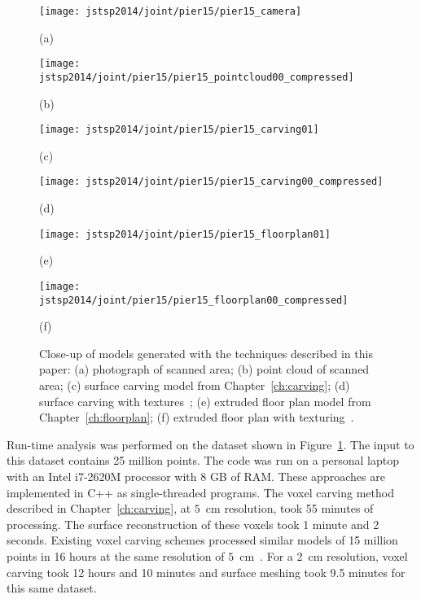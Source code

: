 \documentclass[12pt,onecolumn,oneside]{book}
\begin{document}
\begin{figure}[p]

	\centering
	\begin{minipage}[t]{0.49\linewidth}
		\centerline{\texttt{[image: jstsp2014/joint/pier15/pier15\_camera]}}
		\centerline{(a)}\medskip
	\end{minipage}
	\hfill
	\begin{minipage}[t]{0.49\linewidth}
		\centerline{\texttt{[image: jstsp2014/joint/pier15/pier15\_pointcloud00\_compressed]}}
		\centerline{(b)}\medskip
	\end{minipage}

	\begin{minipage}[t]{0.49\linewidth}
		\centerline{\texttt{[image: jstsp2014/joint/pier15/pier15\_carving01]}}
		\centerline{(c)}\medskip
	\end{minipage}
	\hfill
	\begin{minipage}[t]{0.49\linewidth}
		\centerline{\texttt{[image: jstsp2014/joint/pier15/pier15\_carving00\_compressed]}}
		\centerline{(d)}\medskip
	\end{minipage}
	
	\begin{minipage}[t]{0.49\linewidth}
		\centerline{\texttt{[image: jstsp2014/joint/pier15/pier15\_floorplan01]}}
		\centerline{(e)}\medskip
	\end{minipage}
	\hfill
	\begin{minipage}[t]{0.49\linewidth}
		\centerline{\texttt{[image: jstsp2014/joint/pier15/pier15\_floorplan00\_compressed]}}
		\centerline{(f)}\medskip
	\end{minipage}
	
	\caption[Comparison of models of construction environment.]{Close-up of models generated with the techniques described in this paper:  (a) photograph of scanned area; (b) point cloud of scanned area; (c) surface carving model from Chapter~\ref{ch:carving}; (d) surface carving with textures~\cite{Cheng14}; (e) extruded floor plan model from Chapter~\ref{ch:floorplan}; (f) extruded floor plan with texturing~\cite{Cheng14}.}
	\label{fig:compare_pier15}

\end{figure}


Run-time analysis was performed on the dataset shown in Figure~\ref{fig:compare_pier15}.  The input to this dataset contains 25 million points.  The code was run on a personal laptop with an Intel i7-2620M processor with 8 GB of RAM.  These approaches are implemented in C++ as single-threaded programs.  The voxel carving method described in Chapter~\ref{ch:carving}, at $5$~cm resolution, took 55 minutes of processing.  The surface reconstruction of these voxels took 1 minute and 2 seconds.  Existing voxel carving schemes processed similar models of 15 million points in 16 hours at the same resolution of $5$~cm~\cite{Carving}.  For a 2~cm resolution, voxel carving took 12 hours and 10 minutes and surface meshing took 9.5 minutes for this same dataset.
\end{document}
